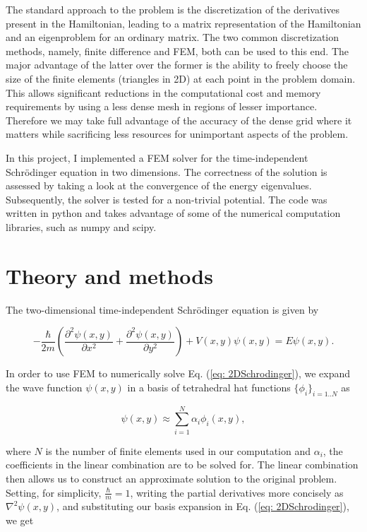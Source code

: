 \documentclass[a4paper,12pt]{article}
\begin{document}
The standard approach to the problem is the discretization of the derivatives present in the Hamiltonian, leading to a matrix representation of the Hamiltonian and an eigenproblem for an ordinary matrix. The two common discretization methods, namely, finite difference and FEM, both can be used to this end. The major advantage of the latter over the former is the ability to freely choose the size of the finite elements (triangles in 2D) at each point in the problem domain. This allows significant reductions in the computational cost and memory requirements by using a less dense mesh in regions of lesser importance. Therefore we may take full advantage of the accuracy of the dense grid where it matters while sacrificing less resources for unimportant aspects of the problem.

In this project, I implemented a FEM solver for the time-independent Schrödinger equation in two dimensions. The correctness of the solution is assessed by taking a look at the convergence of the energy eigenvalues. Subsequently, the solver is tested for a non-trivial potential. The code was written in python and takes advantage of some of the numerical computation libraries, such as numpy and scipy.


\cleardoublepage
\section{Theory and methods}

The two-dimensional time-independent Schrödinger equation is given by

\begin{equation}
\label{eq: 2DSchrodinger}
-\frac{\hbar}{2m} \left( \frac{\partial^2 \psi (x,y)}{\partial x^2} + \frac{\partial^2 \psi (x,y)}{\partial y^2} \right) + V(x,y)\psi (x,y) = E \psi (x,y) .
\end{equation}

In order to use FEM to numerically solve Eq. (\ref{eq: 2DSchrodinger}), we expand the wave function $\psi (x,y)$ in a basis of tetrahedral hat functions $\lbrace \phi_i \rbrace_{i=1..N}$ as

\begin{equation}
\label{eq: basisExpansion}
\psi (x,y) \approx \sum_{i=1}^{N} \alpha_i \phi_i(x,y),
\end{equation}

where $N$ is the number of finite elements used in our computation and $\alpha_i$, the coefficients in the linear combination are to be solved for. The linear combination then allows us to construct an approximate solution to the original problem. Setting, for simplicity, $\frac{\hbar}{m} = 1$, writing the partial derivatives more concisely as $\nabla^2 \psi(x,y)$, and substituting our basis expansion in Eq. (\ref{eq: 2DSchrodinger}), we get 
\end{document}
